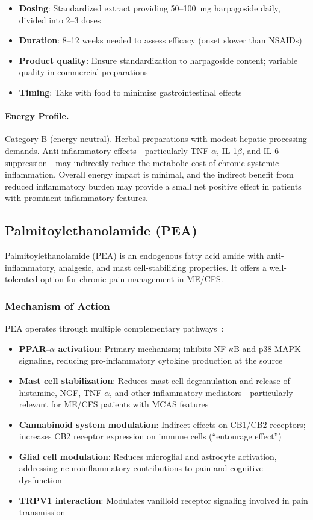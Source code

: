 \begin{itemize}
    \item \textbf{Dosing}: Standardized extract providing 50--100~mg harpagoside daily, divided into 2--3 doses
    \item \textbf{Duration}: 8--12 weeks needed to assess efficacy (onset slower than NSAIDs)
    \item \textbf{Product quality}: Ensure standardization to harpagoside content; variable quality in commercial preparations
    \item \textbf{Timing}: Take with food to minimize gastrointestinal effects
\end{itemize}

\paragraph{Energy Profile.}
Category B (energy-neutral). Herbal preparations with modest hepatic processing demands. Anti-inflammatory effects---particularly TNF-$\alpha$, IL-1$\beta$, and IL-6 suppression---may indirectly reduce the metabolic cost of chronic systemic inflammation. Overall energy impact is minimal, and the indirect benefit from reduced inflammatory burden may provide a small net positive effect in patients with prominent inflammatory features.

\subsection{Palmitoylethanolamide (PEA)}

Palmitoylethanolamide (PEA) is an endogenous fatty acid amide with anti-inflammatory, analgesic, and mast cell-stabilizing properties. It offers a well-tolerated option for chronic pain management in ME/CFS.

\subsubsection{Mechanism of Action}

PEA operates through multiple complementary pathways~\cite{Petrosino2021PEA}:
\begin{itemize}
    \item \textbf{PPAR-$\alpha$ activation}: Primary mechanism; inhibits NF-$\kappa$B and p38-MAPK signaling, reducing pro-inflammatory cytokine production at the source
    \item \textbf{Mast cell stabilization}: Reduces mast cell degranulation and release of histamine, NGF, TNF-$\alpha$, and other inflammatory mediators---particularly relevant for ME/CFS patients with MCAS features
    \item \textbf{Cannabinoid system modulation}: Indirect effects on CB1/CB2 receptors; increases CB2 receptor expression on immune cells (``entourage effect'')
    \item \textbf{Glial cell modulation}: Reduces microglial and astrocyte activation, addressing neuroinflammatory contributions to pain and cognitive dysfunction
    \item \textbf{TRPV1 interaction}: Modulates vanilloid receptor signaling involved in pain transmission
\end{itemize}

